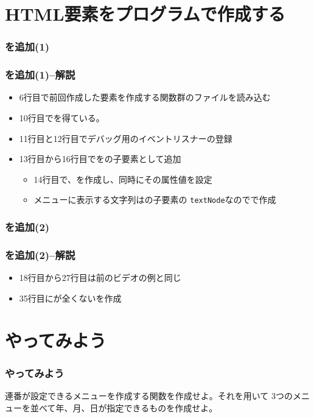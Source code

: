 \section{HTML要素をプログラムで作成する}
\begin{frame}[containsverbatim]
 \frametitle{を追加(1)}
\end{frame}
\begin{frame}[containsverbatim]
 \frametitle{を追加(1)--解説}
 \begin{itemize}
  \item 6行目で前回作成した要素を作成する関数群のファイルを読み込む
  \item 10行目でを得ている。
  \item 11行目と12行目でデバッグ用のイベントリスナーの登録
  \item 13行目から16行目でをの子要素として追加
        \begin{itemize}
         \item 14行目で、を作成し、同時にその属性値を設定
         \item メニューに表示する文字列はの子要素の
               \Verb+textNode+なのでで作成
        \end{itemize}
 \end{itemize}
\end{frame}
\begin{frame}[containsverbatim]
 \frametitle{を追加(2)}
\end{frame}
\begin{frame}[containsverbatim]
 \frametitle{を追加(2)--解説}
 \begin{itemize}
  \item 18行目から27行目は前のビデオの例と同じ
  \item 35行目にが全くないを作成
 \end{itemize}
\end{frame}
 \section{やってみよう}
 \begin{frame}[containsverbatim]
\frametitle{やってみよう}
  連番が設定できるメニューを作成する関数を作成せよ。それを用いて
        3つのメニューを並べて年、月、日が指定できるものを作成せよ。
 \end{frame}
%

\begin{frame}[containsverbatim]
 \frametitle{}
\end{frame}
